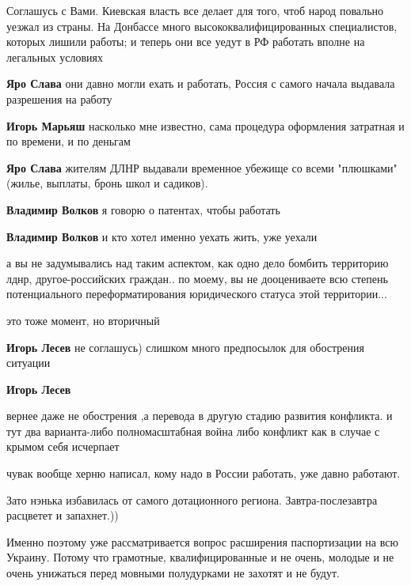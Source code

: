 \begin{itemize}

Соглашусь с Вами. Киевская власть все делает для того, чтоб народ повально
уезжал из страны. На Донбассе много высококвалифицированных специалистов,
которых лишили работы; и теперь они все уедут в РФ работать вполне на легальных
условиях

\begin{itemize} %
\textbf{Яро Слава} они давно могли ехать и работать, Россия с самого начала выдавала разрешения на работу

\textbf{Игорь Марьяш} насколько мне известно, сама процедура оформления затратная и по времени, и по деньгам

\textbf{Яро Слава} жителям ДЛНР выдавали временное убежище со всеми "плюшками" (жилье, выплаты, бронь школ и садиков).

\textbf{Владимир Волков} я говорю о патентах, чтобы работать

\textbf{Владимир Волков} и кто хотел именно уехать жить, уже уехали
\end{itemize} %


а вы не задумывались над таким аспектом, как одно дело бомбить территорию
лднр, другое-российских граждан.. по моему, вы не дооцениваете всю степень
потенциального переформатирования юридического статуса этой территории...

\begin{itemize} %
это тоже момент, но вторичный

\textbf{Игорь Лесев} не соглашусь) слишком много предпосылок для обострения ситуации

\textbf{Игорь Лесев} 

вернее даже не обострения ,а перевода в другую стадию развития конфликта. и тут
два варианта-либо полномасштабная война либо конфликт как в случае с крымом
себя исчерпает

чувак вообще херню написал, кому надо в России работать, уже давно работают.
\end{itemize} %

Зато нэнька избавилась от самого дотационного региона. Завтра-послезавтра расцветет и запахнет.))


Именно поэтому уже рассматривается вопрос расширения паспортизации на всю
Украину. Потому что грамотные, квалифицированные и не очень, молодые и не очень
унижаться перед мовными полудурками не захотят и не будут.


\end{itemize}
